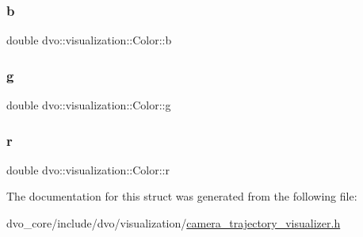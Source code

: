 \subsubsection{\texorpdfstring{b}{b}}
{\footnotesize\ttfamily double dvo\+::visualization\+::\+Color\+::b}

\mbox{\label{structdvo_1_1visualization_1_1_color_a683bddf0b9bd3d6d8a229a25a68d20b0}} 
\subsubsection{\texorpdfstring{g}{g}}
{\footnotesize\ttfamily double dvo\+::visualization\+::\+Color\+::g}

\mbox{\label{structdvo_1_1visualization_1_1_color_a6941dd0d782ff4ecb73e0b4b0ac90f34}} 
\subsubsection{\texorpdfstring{r}{r}}
{\footnotesize\ttfamily double dvo\+::visualization\+::\+Color\+::r}



The documentation for this struct was generated from the following file\+:\begin{DoxyCompactItemize}
\item 
dvo\+\_\+core/include/dvo/visualization/\mbox{\hyperlink{camera__trajectory__visualizer_8h}{camera\+\_\+trajectory\+\_\+visualizer.\+h}}\end{DoxyCompactItemize}
